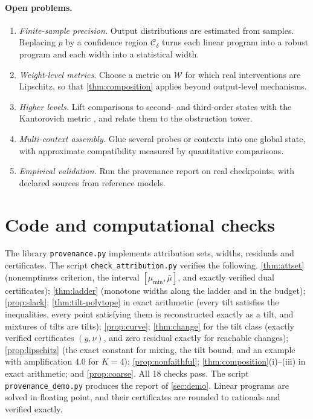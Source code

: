 \documentclass[11pt]{article}
\theoremstyle{definition}
\theoremstyle{remark}
\newcommand{\cW}{\mathcal{W}}
\begin{document}
\paragraph{Open problems.}
\begin{enumerate}[leftmargin=*]
\item \emph{Finite-sample precision.} Output distributions are estimated from samples. Replacing $p$ by
  a confidence region $\mathcal C_\delta$ turns each linear program into a robust program and each width
  into a statistical width.
\item \emph{Weight-level metrics.} Choose a metric on $\cW$ for which real interventions are Lipschitz,
  so that \cref{thm:composition} applies beyond output-level mechanisms.
\item \emph{Higher levels.} Lift comparisons to second- and third-order states with the Kantorovich
  metric \cite{FritzPerrone2019}, and relate them to the obstruction tower.
\item \emph{Multi-context assembly.} Glue several probes or contexts into one global state, with
  approximate compatibility measured by quantitative comparisons.
\item \emph{Empirical validation.} Run the provenance report on real checkpoints, with declared sources
  from reference models.
\end{enumerate}

\appendix

\section{Code and computational checks}\label{sec:code}

The library \texttt{provenance.py} implements attribution sets, widths, residuals and certificates.
The script \texttt{check\allowbreak\_attribution.py} verifies the following.
\cref{thm:attset} (nonemptiness criterion, the interval $[\mu_{\min},\bar\mu]$, and exactly verified dual
certificates); \cref{thm:ladder} (monotone widths along the ladder and in the budget);
\cref{prop:slack}; \cref{thm:tilt-polytope} in exact arithmetic (every tilt satisfies the inequalities,
every point satisfying them is reconstructed exactly as a tilt, and mixtures of tilts are tilts);
\cref{prop:curve}; \cref{thm:change} for the tilt class (exactly verified certificates $(y,\nu)$, and
zero residual exactly for reachable changes); \cref{prop:lipschitz} (the exact constant for mixing, the
tilt bound, and an example with amplification $4.0$ for $K=4$); \cref{prop:nonfaithful};
\cref{thm:composition}(i)--(iii) in exact arithmetic; and \cref{prop:coarse}. All 18 checks pass.
The script \texttt{provenance\allowbreak\_demo.py} produces the report of \cref{sec:demo}. Linear programs are solved in
floating point, and their certificates are rounded to rationals and verified exactly.
\end{document}
